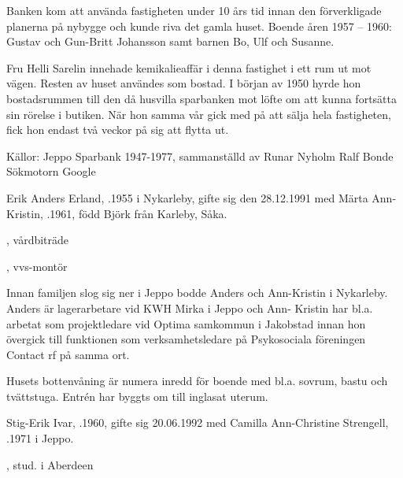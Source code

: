 Banken kom att använda fastigheten under 10 års tid innan den förverkligade planerna på nybygge och kunde riva det gamla huset.	Boende åren
1957 – 1960: Gustav och Gun-Britt Johansson samt barnen Bo, Ulf och Susanne.


Fru Helli Sarelin innehade kemikalieaffär i denna fastighet i ett rum ut mot vägen. Resten av huset användes som bostad. I början av 	1950 hyrde hon bostadsrummen till den då husvilla sparbanken mot löfte om att kunna fortsätta sin rörelse i butiken. När hon samma vår gick med på att sälja hela fastigheten, fick hon endast två veckor på 	sig att flytta ut.


Källor:
Jeppo Sparbank 1947-1977, sammanställd av Runar Nyholm
Ralf Bonde
Sökmotorn Google




Erik Anders Erland, .1955 i Nykarleby, gifte sig den 28.12.1991 med Märta Ann-Kristin, .1961, född Björk från Karleby, Såka.
\begin{jhchildren}
  \item {}, vårdbiträde
  \item {}, vvs-montör
\end{jhchildren}

Innan familjen slog sig ner i Jeppo bodde Anders och Ann-Kristin i Nykarleby. Anders är lagerarbetare vid KWH Mirka i Jeppo och Ann-	Kristin har bl.a. arbetat som projektledare vid Optima samkommun i 	Jakobstad innan hon övergick till funktionen som verksamhetsledare 	på Psykosociala föreningen Contact rf på samma ort.


Husets bottenvåning är numera inredd för boende med bl.a. sovrum, bastu och tvättstuga. Entrén har byggts om till inglasat uterum.



Stig-Erik Ivar, .1960, gifte sig 20.06.1992 med Camilla Ann-Christine Strengell, .1971 i Jeppo.
\begin{jhchildren}
  \item {}, stud. i Aberdeen
  \item {}
  \item {}
  \item {}
\end{jhchildren}

